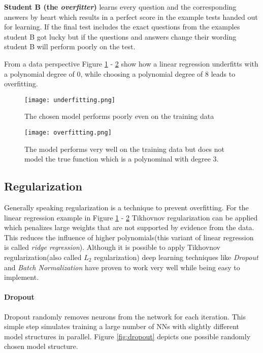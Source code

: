 \textbf{Student B (the \emph{overfitter})} learns every question and the corresponding answers by heart which results in a perfect score in the example tests handed out for learning. If the final test includes the exact questions from the examples student B got lucky but if the questions and answers change their wording student B will perform poorly on the test. 

From a data perspective Figure \ref{fig:underfitting} - \ref{fig:overfitting} show how a linear regression underfitts with a polynomial degree of 0, while choosing a polynomial degree of 8 leads to overfitting.

\begin{figure}
\centering
  \texttt{[image: underfitting.png]}
  \caption{The chosen model performs poorly even on the training data\cite{LVDFKI}
}\label{fig:underfitting}
\end{figure}

 \begin{figure}
\centering
  \texttt{[image: overfitting.png]}
  \caption{The model performs very well on the training data but does not model the true function which is a polynominal with degree 3. \cite{LVDFKI}
}\label{fig:overfitting}
\end{figure}


\subsection{Regularization}\label{ssec:regularization}
Generally speaking regularization is a technique to prevent overfitting.
For the linear regression example in Figure \ref{fig:underfitting} - \ref{fig:overfitting} Tikhovnov regularization can be applied which penalizes large weights that are not supported by evidence from the data. This reduces the influence of higher polynomials(this variant of linear regression is called \emph{ridge regression}).
Although it is possible to apply Tikhovnov regularization(also called $L_2$ regularization) deep learning techniques like \emph{Dropout} and \emph{Batch Normalization} have proven to work very well while being easy to implement.
\paragraph{Dropout}
Dropout randomly removes neurons from the network for each iteration. 
This simple step simulates training a large number of NNs with slightly different model structures in parallel.
Figure \ref{fig:dropout} depicts one possible randomly chosen model structure.

